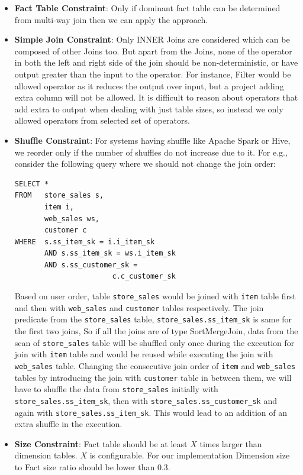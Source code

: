 \begin{itemize}
\item \textbf{Fact Table Constraint}: Only if dominant fact table can be determined from multi-way join then we can apply the approach.
\item \textbf{Simple Join Constraint}: Only INNER Joins are considered which can be composed of other Joins too. But apart from the Joins, none of the operator in both the left and right side of the join should be non-deterministic, or have output greater than the input to the operator. For instance, Filter would be allowed operator as it reduces the output over input, but a project adding extra column will not be allowed. It is difficult to reason about operators that add extra to output when dealing with just table sizes, so instead we only allowed operators from selected set of operators.
\item \textbf{Shuffle Constraint}: For systems having shuffle like Apache Spark or Hive, we reorder only if the number of shuffles do not increase due to it. For e.g., consider the following query where we should not change the join order: 
\begin{verbatim}
SELECT * 
FROM   store_sales s, 
       item i, 
       web_sales ws, 
       customer c 
WHERE  s.ss_item_sk = i.i_item_sk 
       AND s.ss_item_sk = ws.i_item_sk 
       AND s.ss_customer_sk = 
                       c.c_customer_sk
\end{verbatim}

Based on user order, table \texttt{store\_sales} would be joined with \texttt{item} table first and then with \texttt{web\_sales} and \texttt{customer} tables respectively. The join predicate from the \texttt{store\_sales} table, \texttt{store\_sales.ss\_item\_sk} is same for the first two joins, So if all the joins are of type SortMergeJoin, data from the scan of \texttt{store\_sales} table will be shuffled only once during the execution for join with \texttt{item} table and would be reused while executing the join with \texttt{web\_sales} table. Changing the consecutive join order of \texttt{item} and \texttt{web\_sales} tables by introducing the join with \texttt{customer} table in between them, we will have to shuffle the data from \texttt{store\_sales} initially with \texttt{store\_sales.ss\_item\_sk}, then with \texttt{store\_sales.ss\_customer\_sk} and again with   \texttt{store\_sales.ss\_item\_sk}. This would lead to an addition of an extra shuffle in the execution.
\item \textbf{Size Constraint}: Fact table should be at least $X$ times larger than dimension tables. $X$ is configurable. For our implementation Dimension size to Fact size  ratio should be lower than 0.3.
\end{itemize}

